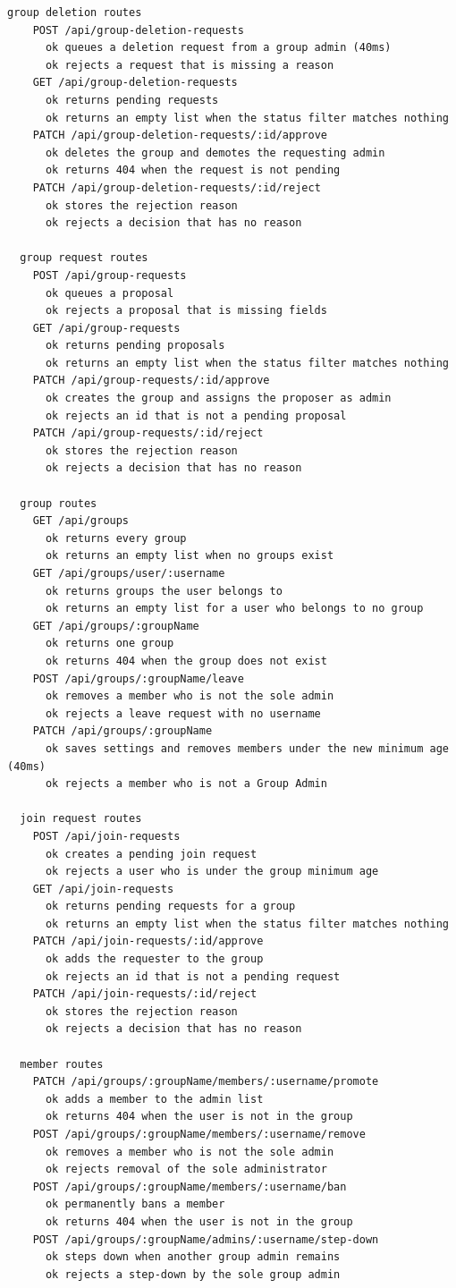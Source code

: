 \documentclass[10pt,a4paper]{article}
\begin{document}
\begin{Verbatim}[fontsize=\scriptsize,breaklines,frame=single]
  group deletion routes
    POST /api/group-deletion-requests
      ok queues a deletion request from a group admin (40ms)
      ok rejects a request that is missing a reason
    GET /api/group-deletion-requests
      ok returns pending requests
      ok returns an empty list when the status filter matches nothing
    PATCH /api/group-deletion-requests/:id/approve
      ok deletes the group and demotes the requesting admin
      ok returns 404 when the request is not pending
    PATCH /api/group-deletion-requests/:id/reject
      ok stores the rejection reason
      ok rejects a decision that has no reason

  group request routes
    POST /api/group-requests
      ok queues a proposal
      ok rejects a proposal that is missing fields
    GET /api/group-requests
      ok returns pending proposals
      ok returns an empty list when the status filter matches nothing
    PATCH /api/group-requests/:id/approve
      ok creates the group and assigns the proposer as admin
      ok rejects an id that is not a pending proposal
    PATCH /api/group-requests/:id/reject
      ok stores the rejection reason
      ok rejects a decision that has no reason

  group routes
    GET /api/groups
      ok returns every group
      ok returns an empty list when no groups exist
    GET /api/groups/user/:username
      ok returns groups the user belongs to
      ok returns an empty list for a user who belongs to no group
    GET /api/groups/:groupName
      ok returns one group
      ok returns 404 when the group does not exist
    POST /api/groups/:groupName/leave
      ok removes a member who is not the sole admin
      ok rejects a leave request with no username
    PATCH /api/groups/:groupName
      ok saves settings and removes members under the new minimum age (40ms)
      ok rejects a member who is not a Group Admin

  join request routes
    POST /api/join-requests
      ok creates a pending join request
      ok rejects a user who is under the group minimum age
    GET /api/join-requests
      ok returns pending requests for a group
      ok returns an empty list when the status filter matches nothing
    PATCH /api/join-requests/:id/approve
      ok adds the requester to the group
      ok rejects an id that is not a pending request
    PATCH /api/join-requests/:id/reject
      ok stores the rejection reason
      ok rejects a decision that has no reason

  member routes
    PATCH /api/groups/:groupName/members/:username/promote
      ok adds a member to the admin list
      ok returns 404 when the user is not in the group
    POST /api/groups/:groupName/members/:username/remove
      ok removes a member who is not the sole admin
      ok rejects removal of the sole administrator
    POST /api/groups/:groupName/members/:username/ban
      ok permanently bans a member
      ok returns 404 when the user is not in the group
    POST /api/groups/:groupName/admins/:username/step-down
      ok steps down when another group admin remains
      ok rejects a step-down by the sole group admin


\end{Verbatim}
\end{document}
